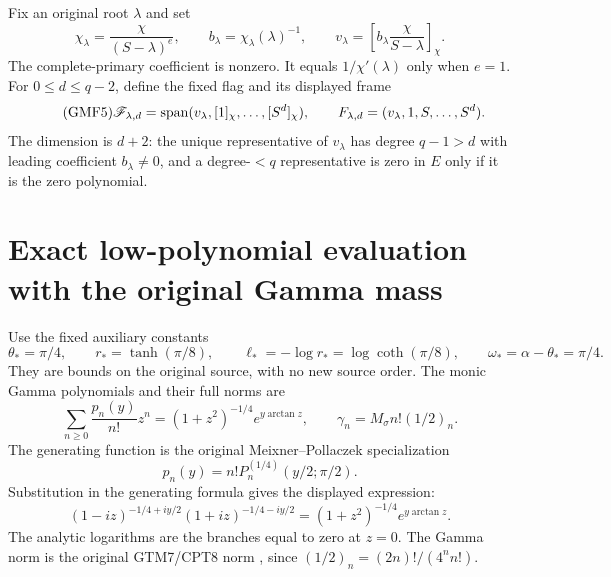 \documentclass[11pt,a4paper]{article}
\begin{document}
Fix an original root \(\lambda\) and set
\begin{equation}\tag{GMF4}
 \chi_\lambda=\frac{\chi}{(S-\lambda)^e},\qquad
 b_\lambda=\chi_\lambda(\lambda)^{-1},\qquad
 v_\lambda=\left[b_\lambda\frac{\chi}{S-\lambda}\right]_\chi .
\end{equation}
The complete-primary coefficient is nonzero.
It equals \(1/\chi'(\lambda)\) only when \(e=1\).
For \(0\le d\le q-2\), define the fixed flag and its displayed frame
\begin{equation}\tag{GMF5}
 \mathscr F_{\lambda,d}
 =\operatorname{span}(v_\lambda,[1]_\chi,\ldots,[S^d]_\chi),
 \qquad F_{\lambda,d}=(v_\lambda,1,S,\ldots,S^d).
\end{equation}
The dimension is \(d+2\): the unique representative of
\(v_\lambda\) has degree \(q-1>d\) with leading coefficient
\(b_\lambda\ne0\), and a degree-\(<q\) representative is zero
in \(E\) only if it is the zero polynomial.

\section{Exact low-polynomial evaluation with the original Gamma mass}

Use the fixed auxiliary constants
\begin{equation}\tag{GMF6}
 \theta_*=\pi/4,\qquad
 r_*=\tanh(\pi/8),\qquad
 \ell_*=-\log r_*=\log\coth(\pi/8),\qquad
 \omega_*=\alpha-\theta_*=\pi/4.
\end{equation}
They are bounds on the original source, with no new source order.
The monic Gamma polynomials and their full norms are
\[
 \sum_{n\ge0}\frac{p_n(y)}{n!}z^n
 =(1+z^2)^{-1/4}e^{y\arctan z},\qquad
 \gamma_n=M_\sigma n!(1/2)_n.
\]
The generating function is the original
Meixner--Pollaczek specialization
\[p_n(y)=n!P_n^{(1/4)}(y/2;\pi/2).\]
Substitution in the generating formula
\cite[(18.23.7)]{a02gmf:dlmfMPgen} gives the displayed expression:
\[
 (1-iz)^{-1/4+iy/2}(1+iz)^{-1/4-iy/2}
       =(1+z^2)^{-1/4}e^{y\arctan z}.
\]
The analytic logarithms are the branches equal to zero at \(z=0\).
The Gamma norm is the original GTM7/CPT8 norm
\cite{a02gmf:providers,a02gmf:cpt}, since
\((1/2)_n=(2n)!/(4^n n!)\).
\end{document}
